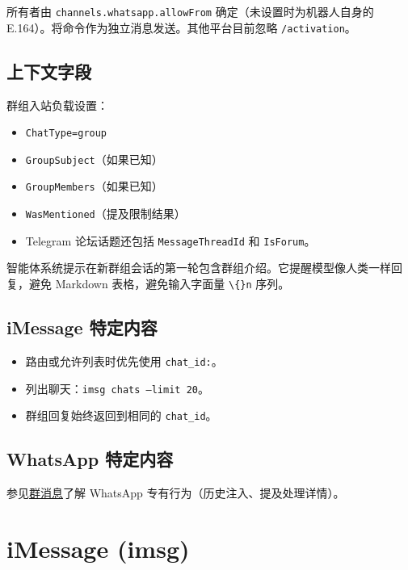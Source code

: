 所有者由 \texttt{channels.whatsapp.allowFrom} 确定（未设置时为机器人自身的 E.164）。将命令作为独立消息发送。其他平台目前忽略 \texttt{/activation}。

\subsection{上下文字段}


群组入站负载设置：

\begin{itemize}
  \item \texttt{ChatType=group}
  \item \texttt{GroupSubject}（如果已知）
  \item \texttt{GroupMembers}（如果已知）
  \item \texttt{WasMentioned}（提及限制结果）
  \item Telegram 论坛话题还包括 \texttt{MessageThreadId} 和 \texttt{IsForum}。
\end{itemize}


智能体系统提示在新群组会话的第一轮包含群组介绍。它提醒模型像人类一样回复，避免 Markdown 表格，避免输入字面量 \texttt{\textbackslash\{\}n} 序列。

\subsection{iMessage 特定内容}


\begin{itemize}
  \item 路由或允许列表时优先使用 \texttt{chat\_id:}。
  \item 列出聊天：\texttt{imsg chats --limit 20}。
  \item 群组回复始终返回到相同的 \texttt{chat\_id}。
\end{itemize}


\subsection{WhatsApp 特定内容}


参见\href{/channels/group-messages}{群消息}了解 WhatsApp 专有行为（历史注入、提及处理详情）。


\clearpage

\section{iMessage (imsg)}


